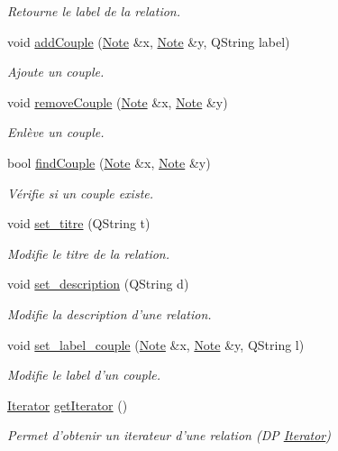 \begin{DoxyCompactItemize}
\begin{DoxyCompactList}\small\item\em Retourne le label de la relation. \end{DoxyCompactList}\item 
void \hyperlink{class_relation_a76525dab4934b348fa2965db522328dc}{add\-Couple} (\hyperlink{class_note}{Note} \&x, \hyperlink{class_note}{Note} \&y, Q\-String label)
\begin{DoxyCompactList}\small\item\em Ajoute un couple. \end{DoxyCompactList}\item 
void \hyperlink{class_relation_a3eea7d0010a6f986e3232719a92532d3}{remove\-Couple} (\hyperlink{class_note}{Note} \&x, \hyperlink{class_note}{Note} \&y)
\begin{DoxyCompactList}\small\item\em Enlève un couple. \end{DoxyCompactList}\item 
bool \hyperlink{class_relation_a146f3e9af006e240932ec75358710213}{find\-Couple} (\hyperlink{class_note}{Note} \&x, \hyperlink{class_note}{Note} \&y)
\begin{DoxyCompactList}\small\item\em Vérifie si un couple existe. \end{DoxyCompactList}\item 
void \hyperlink{class_relation_a122d5b07a1cef9f923c8ce01760c04fe}{set\-\_\-titre} (Q\-String t)
\begin{DoxyCompactList}\small\item\em Modifie le titre de la relation. \end{DoxyCompactList}\item 
void \hyperlink{class_relation_aa1b4491b12196cc8b28d1ea8d3f03f78}{set\-\_\-description} (Q\-String d)
\begin{DoxyCompactList}\small\item\em Modifie la description d'une relation. \end{DoxyCompactList}\item 
void \hyperlink{class_relation_a673fb4a0fbc2e403ee1a612623286f61}{set\-\_\-label\-\_\-couple} (\hyperlink{class_note}{Note} \&x, \hyperlink{class_note}{Note} \&y, Q\-String l)
\begin{DoxyCompactList}\small\item\em Modifie le label d'un couple. \end{DoxyCompactList}\item 
\hypertarget{class_relation_ae30f6b7351f9ff6b3ed74422738a6ea2}{\hyperlink{class_relation_1_1_iterator}{Iterator} \hyperlink{class_relation_ae30f6b7351f9ff6b3ed74422738a6ea2}{get\-Iterator} ()}\label{class_relation_ae30f6b7351f9ff6b3ed74422738a6ea2}

\begin{DoxyCompactList}\small\item\em Permet d'obtenir un iterateur d'une relation (D\-P \hyperlink{class_relation_1_1_iterator}{Iterator}) \end{DoxyCompactList}\end{DoxyCompactItemize}
